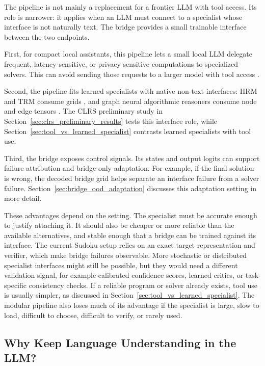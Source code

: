 \documentclass[11pt]{article}
\begin{document}
The pipeline is not mainly a replacement for a frontier LLM with tool access.
Its role is narrower: it applies when an LLM must connect to a specialist whose interface is not naturally text.
The bridge provides a small trainable interface between the two endpoints.

First, for compact local assistants, this pipeline lets a small local LLM delegate frequent, latency-sensitive, or privacy-sensitive computations to specialized solvers.
This can avoid sending those requests to a larger model with tool access \cite{karpasMRKLSystemsModular2022,parisiTALMToolAugmented2022,schickToolformerLanguageModels2023}.

Second, the pipeline fits learned specialists with native non-text interfaces: HRM and TRM consume grids \cite{wangHierarchicalReasoningModel2025,jolicoeur-martineauLessMoreRecursive2025}, and graph neural algorithmic reasoners consume node and edge tensors \cite{bounsiTransformersMeetNeural2024}.
The CLRS preliminary study in Section~\ref{sec:clrs_preliminary_results} tests this interface role, while Section~\ref{sec:tool_vs_learned_specialist} contrasts learned specialists with tool use.

Third, the bridge exposes control signals.
Its states and output logits can support failure attribution and bridge-only adaptation.
For example, if the final solution is wrong, the decoded bridge grid helps separate an interface failure from a solver failure.
Section~\ref{sec:bridge_ood_adaptation} discusses this adaptation setting in more detail.

These advantages depend on the setting.
The specialist must be accurate enough to justify attaching it.
It should also be cheaper or more reliable than the available alternatives, and stable enough that a bridge can be trained against its interface.
The current Sudoku setup relies on an exact target representation and verifier, which make bridge failures observable.
More stochastic or distributed specialist interfaces might still be possible, but they would need a different validation signal, for example calibrated confidence scores, learned critics, or task-specific consistency checks.
If a reliable program or solver already exists, tool use is usually simpler, as discussed in Section~\ref{sec:tool_vs_learned_specialist}.
The modular pipeline also loses much of its advantage if the specialist is large, slow to load, difficult to choose, difficult to verify, or rarely used.

\subsection{Why Keep Language Understanding in the LLM?}
\label{sec:llm_frontend_motivation}
\end{document}

